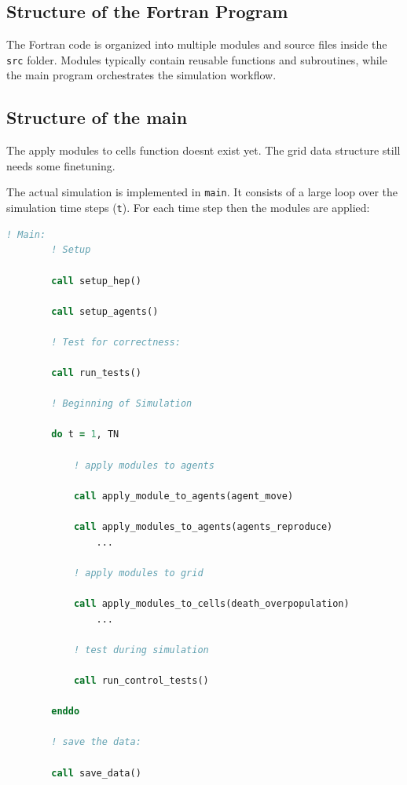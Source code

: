 \documentclass[11pt,a4paper]{article}
\newcommand{\Bemerkung}[1]{\color{red}#1\color{black}}
\begin{document}
\subsection{Structure of the Fortran Program}

The Fortran code is organized into multiple modules and source files inside the \texttt{src} folder. 
Modules typically contain reusable functions and subroutines, while the main program orchestrates the simulation workflow.


\subsection{Structure of the main}\label{structure_main}

\Bemerkung{The apply modules to cells function doesnt exist yet. The grid data structure still needs some finetuning.}



The actual simulation is implemented in \texttt{main}. It consists of a large loop over the simulation time steps (\texttt{t}). For each time step then the modules are applied: 
\begin{lstlisting}[language=fortran]
! Main:
        ! Setup

        call setup_hep()

        call setup_agents()

        ! Test for correctness: 

        call run_tests()

        ! Beginning of Simulation
   
        do t = 1, TN

            ! apply modules to agents
    
            call apply_module_to_agents(agent_move)
    
            call apply_modules_to_agents(agents_reproduce)
                ...

            ! apply modules to grid
            
            call apply_modules_to_cells(death_overpopulation)
                ...

            ! test during simulation

            call run_control_tests()
            
        enddo 

        ! save the data:

        call save_data()
\end{lstlisting}
\end{document}
